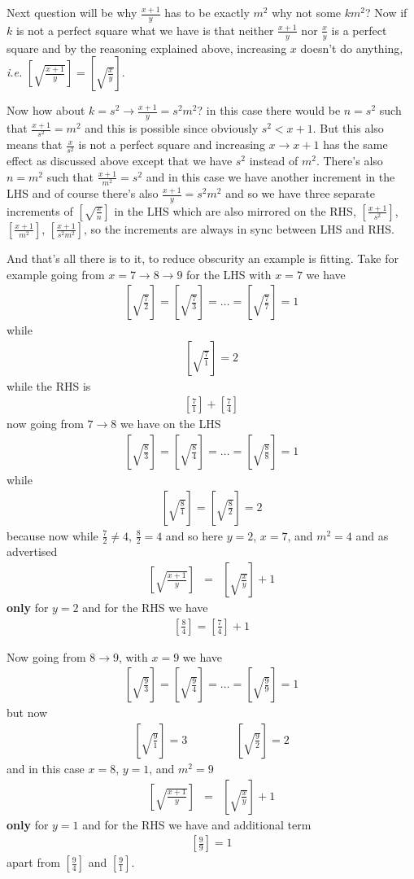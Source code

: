 \documentclass[aps,preprint,preprintnumbers,nofootinbib,showpacs,prd]{revtex4-1}
\newcommand{\ie}{{\it i.e.} }
\newcommand{\nbea}{\begin{eqnarray*}}
\newcommand{\neea}{\end{eqnarray*}}
\begin{document}
Next question will be why $\frac{x+1}{y}$ has to be exactly $m^2$ why not some $km^2$? Now if $k$ is not a perfect square what we have is that neither $\frac{x+1}{y}$ nor $\frac{x}{y}$ is a perfect square and by the reasoning explained above, increasing $x$ doesn't do anything, \ie $\left\lbrack\sqrt{\frac{x+1}{y}}\right\rbrack = \left\lbrack\sqrt{\frac{x}{y}}\right\rbrack$.

Now how about $k = s^2 \to \frac{x+1}{y} = s^2m^2$? in this case there would be $n = s^2$ such that $\frac{x+1}{s^2} = m^2$ and this is possible since obviously $s^2 < x+1$. But this also means that $\frac{x}{s^2}$ is not a perfect square and increasing $x\to x+1$ has the same effect as discussed above except that we have $s^2$ instead of $m^2$. There's also $n=m^2$ such that $\frac{x+1}{m^2} = s^2$ and in this case we have another increment in the LHS and of course there's also $\frac{x+1}{y} = s^2m^2$ and so we have three separate increments of $\left \lbrack\sqrt{\frac{x}{n}}\right\rbrack$ in the LHS which are also mirrored on the RHS, $\left \lbrack \frac{x+1}{s^2} \right\rbrack$, $\left \lbrack \frac{x+1}{m^2} \right\rbrack$, $\left \lbrack \frac{x+1}{s^2m^2} \right\rbrack$, so the increments are always in sync between LHS and RHS.

And that's all there is to it, to reduce obscurity an example is fitting. Take for example going from $x = 7 \to 8 \to 9$ for the LHS with $x = 7$ we have
%
\nbea
\left \lbrack \sqrt{\frac{7}{2}}\right \rbrack = \left \lbrack \sqrt{\frac{7}{3}}\right \rbrack = \ldots = \left \lbrack \sqrt{\frac{7}{7}}\right \rbrack = 1
\neea
%
while 
%
\nbea
\left \lbrack \sqrt{\frac{7}{1}}\right \rbrack = 2
\neea
%
while the RHS is
%
\nbea
\left \lbrack \frac{7}{1}\right \rbrack+\left \lbrack \frac{7}{4}\right \rbrack
\neea
%
now going from $7\to8$ we have on the LHS
%
\nbea
\left \lbrack \sqrt{\frac{8}{3}}\right \rbrack = \left \lbrack \sqrt{\frac{8}{4}}\right \rbrack = \ldots = \left \lbrack \sqrt{\frac{8}{8}}\right \rbrack = 1
\neea
%
while 
%
\nbea
\left \lbrack \sqrt{\frac{8}{1}}\right \rbrack = \left \lbrack \sqrt{\frac{8}{2}}\right \rbrack = 2
\neea
%
because now while $\frac{7}{2} \neq 4$, $\frac{8}{2} = 4$ and so here $y=2$, $x = 7$, and $m^2 = 4$ and as advertised
%
\nbea
\left \lbrack \sqrt{\frac{x+1}{y}}\right \rbrack & = & \left \lbrack \sqrt{\frac{x}{y}}\right \rbrack + 1
\neea
%
{\bf only} for $y = 2$ and for the RHS we have
%
\nbea
\left \lbrack \frac{8}{4}\right \rbrack = \left \lbrack \frac{7}{4}\right \rbrack + 1
\neea
%

Now going from $8\to9$, with $x=9$ we have
%
\nbea
\left \lbrack \sqrt{\frac{9}{3}}\right \rbrack = \left \lbrack \sqrt{\frac{9}{4}}\right \rbrack = \ldots = \left \lbrack \sqrt{\frac{9}{9}}\right \rbrack = 1
\neea
%
but now
%
\nbea
\left \lbrack \sqrt{\frac{9}{1}}\right \rbrack = 3 & ~~~~~~~~~~~~ & \left \lbrack \sqrt{\frac{9}{2}}\right \rbrack = 2
\neea
%
and in this case $x = 8$, $y = 1$, and $m^2 = 9$
%
\nbea
\left \lbrack \sqrt{\frac{x+1}{y}}\right \rbrack & = & \left \lbrack \sqrt{\frac{x}{y}}\right \rbrack + 1
\neea
%
{\bf only} for $y = 1$ and for the RHS we have and additional term
%
\nbea
\left \lbrack \frac{9}{9}\right \rbrack = 1
\neea
%
apart from $\left \lbrack \frac{9}{4}\right \rbrack$ and $\left \lbrack \frac{9}{1}\right \rbrack$. 
\end{document}
